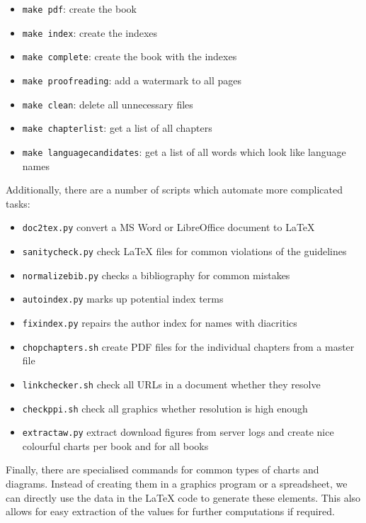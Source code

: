 \documentclass[nonflat,modfonts,output=book] {langsci/langscibook}
\begin{document}
\begin{itemize}
 \item \texttt{make pdf}: create the book 
 \item \texttt{make index}: create the indexes
 \item \texttt{make complete}: create the book with the indexes 
 \item \texttt{make proofreading}: add a watermark to all pages 
 \item \texttt{make clean}: delete all unnecessary files 
 \item \texttt{make chapterlist}: get a list of all chapters 
 \item \texttt{make languagecandidates}: get a list of all words which look like language names
\end{itemize}

Additionally, there are a number of scripts which automate more complicated tasks: 

\begin{itemize}
 \item \texttt{doc2tex.py} convert a MS Word or LibreOffice document to \LaTeX\xspace
 \item \texttt{sanitycheck.py} check \LaTeX\xspace files for common violations of the guidelines
 \item \texttt{normalizebib.py} checks a bibliography for common mistakes 
 \item \texttt{autoindex.py} marks up potential index terms 
 \item \texttt{fixindex.py} repairs the author index for names with diacritics
 \item \texttt{chopchapters.sh} create PDF files for the individual chapters from a master file
 \item \texttt{linkchecker.sh} check all URLs in a document whether they resolve
 \item \texttt{checkppi.sh} check all graphics whether resolution is high enough
 \item \texttt{extractaw.py} extract download figures from server logs and create nice colourful charts per book and for all books
\end{itemize}

Finally, there are specialised commands for common types of charts and diagrams. Instead of creating them in a graphics program or a spreadsheet, we can directly use the data in the \LaTeX\xspace code to generate these elements. This also allows for easy extraction of the values for further computations if required. 
\end{document}
